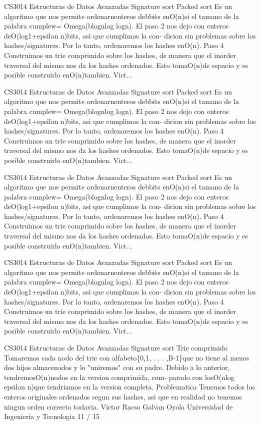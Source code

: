\begin{description}[leftmargin=!,labelwidth=4.2em,style=nextline]
\item[Pag. 31] CS3014 Estructuras de Datos Avanzadas Signature sort Packed sort Es un algoritmo que nos permite ordenarnenteros debbits enO(n)si el tamano de la palabra cumplew= Omega(blognlog logn). El paso 2 nos dejo con enteros deO(log1+epsilon n)bits, asi que cumplimos la con- dicion sin problemas sobre los hashes/signatures. Por lo tanto, ordenaremos los hashes enO(n). Paso 4 Construimos un trie comprimido sobre los hashes, de manera que el inorder traversal del mismo nos da los hashes ordenados. Esto tomaO(n)de espacio y es posible construirlo enO(n)tambien. Vict...
\item[Pag. 32] CS3014 Estructuras de Datos Avanzadas Signature sort Packed sort Es un algoritmo que nos permite ordenarnenteros debbits enO(n)si el tamano de la palabra cumplew= Omega(blognlog logn). El paso 2 nos dejo con enteros deO(log1+epsilon n)bits, asi que cumplimos la con- dicion sin problemas sobre los hashes/signatures. Por lo tanto, ordenaremos los hashes enO(n). Paso 4 Construimos un trie comprimido sobre los hashes, de manera que el inorder traversal del mismo nos da los hashes ordenados. Esto tomaO(n)de espacio y es posible construirlo enO(n)tambien. Vict...
\item[Pag. 33] CS3014 Estructuras de Datos Avanzadas Signature sort Packed sort Es un algoritmo que nos permite ordenarnenteros debbits enO(n)si el tamano de la palabra cumplew= Omega(blognlog logn). El paso 2 nos dejo con enteros deO(log1+epsilon n)bits, asi que cumplimos la con- dicion sin problemas sobre los hashes/signatures. Por lo tanto, ordenaremos los hashes enO(n). Paso 4 Construimos un trie comprimido sobre los hashes, de manera que el inorder traversal del mismo nos da los hashes ordenados. Esto tomaO(n)de espacio y es posible construirlo enO(n)tambien. Vict...
\item[Pag. 34] CS3014 Estructuras de Datos Avanzadas Signature sort Packed sort Es un algoritmo que nos permite ordenarnenteros debbits enO(n)si el tamano de la palabra cumplew= Omega(blognlog logn). El paso 2 nos dejo con enteros deO(log1+epsilon n)bits, asi que cumplimos la con- dicion sin problemas sobre los hashes/signatures. Por lo tanto, ordenaremos los hashes enO(n). Paso 4 Construimos un trie comprimido sobre los hashes, de manera que el inorder traversal del mismo nos da los hashes ordenados. Esto tomaO(n)de espacio y es posible construirlo enO(n)tambien. Vict...
\item[Pag. 35] CS3014 Estructuras de Datos Avanzadas Signature sort Trie comprimido Tomaremos cada nodo del trie con alfabeto\{0,1, . . . ,B-1\}que no tiene al menos dos hijos almacenados y lo "uniremos" con su padre. Debido a lo anterior, tendremosO(n)nodos en la version comprimida, com- parado con losO(nlog epsilon n)que tendriamos en la version completa. Problematica Tenemos todos los enteros originales ordenados segun sus hashes, asi que en realidad no tenemos ningun orden correcto todavia. Victor Racso Galvan Oyola Universidad de Ingenieria y Tecnologia 11 / 15

\end{description}
